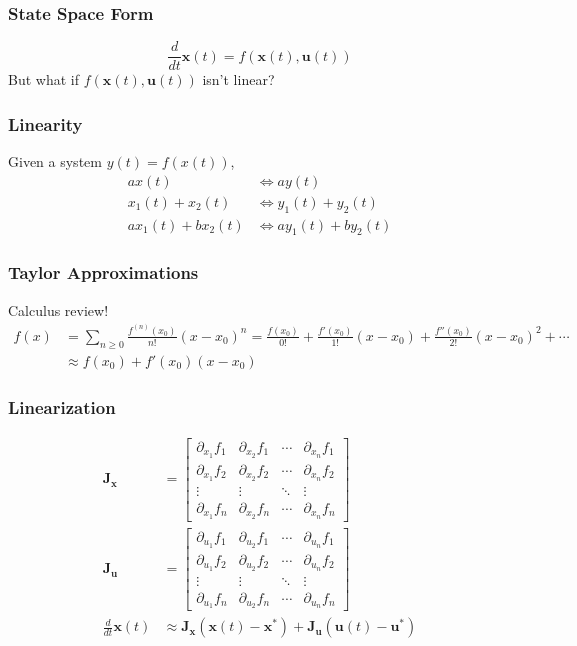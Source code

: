 \documentclass[aspectratio=169]{beamer}
\newcommand{\diff}[1]{\frac{d}{d #1}}
\begin{document}
\begin{frame}
    \frametitle{State Space Form}

    \begin{equation}
        \diff{t} \bm{x}(t) = f(\bm{x}(t), \bm{u}(t))
    \end{equation}
    But what if \(f(\bm{x}(t), \bm{u}(t))\) isn't linear?
\end{frame}

\begin{frame}
    \frametitle{Linearity}

    Given a system \(y(t) = f(x(t))\),
    \begin{align}
        a x(t) &\iff a y(t) \\
        x_1(t) + x_2(t) &\iff y_1(t) + y_2(t) \\
        a x_1(t) + b x_2(t) &\iff a y_1(t) + b y_2(t)
    \end{align}
\end{frame}

\begin{frame}
    \frametitle{Taylor Approximations}

    Calculus review!
    \begin{align}
        f(x) &= \sum_{n \geqslant 0} \frac{f^{(n)}(x_0)}{n!} (x - x_0)^n = \frac{f(x_0)}{0!} + \frac{f'(x_0)}{1!} (x - x_0) + \frac{f''(x_0)}{2!} (x - x_0)^2 + \cdots \\
        &\approx f(x_0) + f'(x_0) (x - x_0)
    \end{align}
\end{frame}

\begin{frame}
    \frametitle{Linearization}

    \begin{align}
        \bm{J}_{\bm{x}} &=
        \begin{bmatrix}
            \partial_{x_1} f_1 & \partial_{x_2} f_1 & \cdots & \partial_{x_n} f_1 \\
            \partial_{x_1} f_2 & \partial_{x_2} f_2 & \cdots & \partial_{x_n} f_2 \\
            \vdots & \vdots & \ddots & \vdots \\
            \partial_{x_1} f_n & \partial_{x_2} f_n & \cdots & \partial_{x_n} f_n
        \end{bmatrix} \\
        \bm{J}_{\bm{u}} &=
        \begin{bmatrix}
            \partial_{u_1} f_1 & \partial_{u_2} f_1 & \cdots & \partial_{u_n} f_1 \\
            \partial_{u_1} f_2 & \partial_{u_2} f_2 & \cdots & \partial_{u_n} f_2 \\
            \vdots & \vdots & \ddots & \vdots \\
            \partial_{u_1} f_n & \partial_{u_2} f_n & \cdots & \partial_{u_n} f_n
        \end{bmatrix} \\
        \diff{t} \bm{x}(t) &\approx \bm{J}_{\bm{x}} (\bm{x}(t) - \bm{x}^\ast) + \bm{J}_{\bm{u}} (\bm{u}(t) -\bm{u}^\ast)
    \end{align}
\end{frame}
\end{document}
